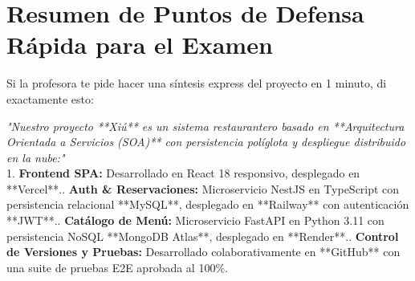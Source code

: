 \documentclass[12pt,a4paper]{article}
\begin{document}
\section{Resumen de Puntos de Defensa Rápida para el Examen}

Si la profesora te pide hacer una síntesis express del proyecto en 1 minuto, di exactamente esto:

\begin{tcolorbox}[colback=verde!10,colframe=verde!80!black,title=Resumen Express de 1 Minuto para el Examen]
\textit{"Nuestro proyecto **Xiú** es un sistema restaurantero basado en **Arquitectura Orientada a Servicios (SOA)** con persistencia políglota y despliegue distribuido en la nube:"}\\[4pt]
1. \textbf{Frontend SPA:} Desarrollado en React 18 responsivo, desplegado en **Vercel**.. \textbf{Auth \& Reservaciones:} Microservicio NestJS en TypeScript con persistencia relacional **MySQL**, desplegado en **Railway** con autenticación **JWT**.. \textbf{Catálogo de Menú:} Microservicio FastAPI en Python 3.11 con persistencia NoSQL **MongoDB Atlas**, desplegado en **Render**.. \textbf{Control de Versiones y Pruebas:} Desarrollado colaborativamente en **GitHub** con una suite de pruebas E2E aprobada al 100\%.
\end{tcolorbox}
\end{document}
